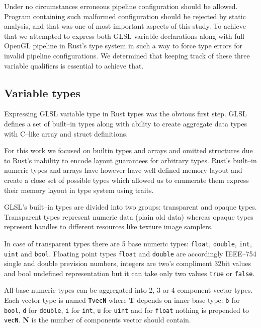 Under no circumstances erroneous pipeline configuration should be allowed. Program containing such malformed configuration should be rejected by static analysis, and that was one of most important aspects of this study.
To achieve that we attempted to express both GLSL variable declarations along with full OpenGL pipeline in Rust's type system in such a way to force type errors for invalid pipeline configurations.
We determined that keeping track of these three variable qualifiers is essential to achieve that.

\subsection{Variable types}

Expressing GLSL variable type in Rust types was the obvious first step. GLSL defines a set of built--in types along with ability to create aggregate data types with C--like array and struct definitions.

For this work we focused on builtin types and arrays and omitted structures due to Rust's inability to encode layout guarantees for arbitrary types.
Rust's built--in numeric types and arrays have however have well defined memory layout and create a close set of possible types which allowed us to enumerate them express their memory layout in type system using traits.

GLSL's built--in types are divided into two groups: transparent and opaque types.
Transparent types represent numeric data (plain old data) whereas opaque types represent handles to different resources like texture image samplers.

In case of transparent types there are 5 base numeric types: \texttt{float}, \texttt{double}, \texttt{int}, \texttt{uint} and \texttt{bool}.
Floating point types \texttt{float} and \texttt{double} are accordingly IEEE--754 single and double prevision numbers, integers are two's compliment 32bit values and bool undefined representation but it can take only two values \texttt{true} or \texttt{false}.

All base numeric types can be aggregated into 2, 3 or 4 component vector types. Each vector type is named \texttt{\textbf{T}vec\textbf{N}}
where \textbf{T} depends on inner base type: \texttt{b} for \texttt{bool}, \texttt{d} for \texttt{double}, \texttt{i} for \texttt{int}, \texttt{u} for \texttt{uint} and for \texttt{float} nothing is prepended to \texttt{vec\textbf{N}}.
\textbf{N} is the number of components vector should contain.

